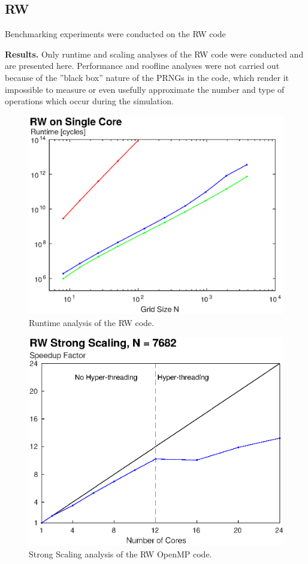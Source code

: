 \documentclass[letterpaper]{article}
\newcommand{\mypar}[1]{{\bf #1.}}
\begin{document}
\subsection{RW}\label{subsec:RW_results}
Benchmarking experiments were conducted on the RW code

\mypar{Results}
Only runtime and scaling analyses of the RW code were conducted and are presented here. Performance and roofline analyses were not carried out because of the ''black box'' nature of the PRNGs in the code, which render it impossible to measure or even usefully approximate the number and type of operations which occur during the simulation.

\begin{figure}\centering
  \includegraphics[width=\linewidth]{./plots/runtime_RW.eps}
  \caption{Runtime analysis of the RW code.}
  \label{fig:runtime_RW}
\end{figure}

\begin{figure}\centering
  \includegraphics[width=\linewidth]{./plots/scaling_strong_RW.eps}
  \caption{Strong Scaling analysis of the RW OpenMP code.}
  \label{fig:scaling_strong_RW}
\end{figure}
\end{document}
